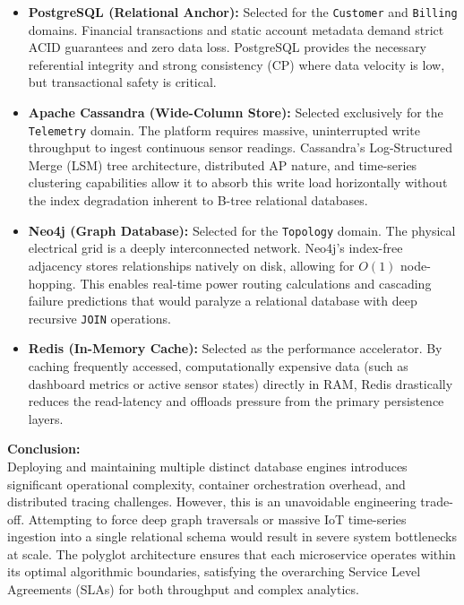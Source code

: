 \documentclass[11pt, a4paper]{article}
\makeatletter
\renewcommand{\_}{\origunderscore\penalty\z@\hskip\z@skip}
\renewcommand{\{}{\origlbrace\penalty\z@\hskip\z@skip}
\renewcommand{\}}{\origrbrace\penalty\z@\hskip\z@skip}
\makeatother
\begin{document}
\begin{itemize}
    \item \textbf{PostgreSQL (Relational Anchor):} Selected for the \texttt{Customer} and \texttt{Billing} domains. Financial transactions and static account metadata demand strict ACID guarantees and zero data loss. PostgreSQL provides the necessary referential integrity and strong consistency (CP) where data velocity is low, but transactional safety is critical.
    
    \item \textbf{Apache Cassandra (Wide-Column Store):} Selected exclusively for the \texttt{Telemetry} domain. The platform requires massive, uninterrupted write throughput to ingest continuous sensor readings. Cassandra's Log-Structured Merge (LSM) tree architecture, distributed AP nature, and time-series clustering capabilities allow it to absorb this write load horizontally without the index degradation inherent to B-tree relational databases.
    
    \item \textbf{Neo4j (Graph Database):} Selected for the \texttt{Topology} domain. The physical electrical grid is a deeply interconnected network. Neo4j's index-free adjacency stores relationships natively on disk, allowing for $O(1)$ node-hopping. This enables real-time power routing calculations and cascading failure predictions that would paralyze a relational database with deep recursive \texttt{JOIN} operations.
    
    \item \textbf{Redis (In-Memory Cache):} Selected as the performance accelerator. By caching frequently accessed, computationally expensive data (such as dashboard metrics or active sensor states) directly in RAM, Redis drastically reduces the read-latency and offloads pressure from the primary persistence layers.
\end{itemize}

\textbf{Conclusion:} \\
Deploying and maintaining multiple distinct database engines introduces significant operational complexity, container orchestration overhead, and distributed tracing challenges. However, this is an unavoidable engineering trade-off. Attempting to force deep graph traversals or massive IoT time-series ingestion into a single relational schema would result in severe system bottlenecks at scale. The polyglot architecture ensures that each microservice operates within its optimal algorithmic boundaries, satisfying the overarching Service Level Agreements (SLAs) for both throughput and complex analytics.
\end{document}
